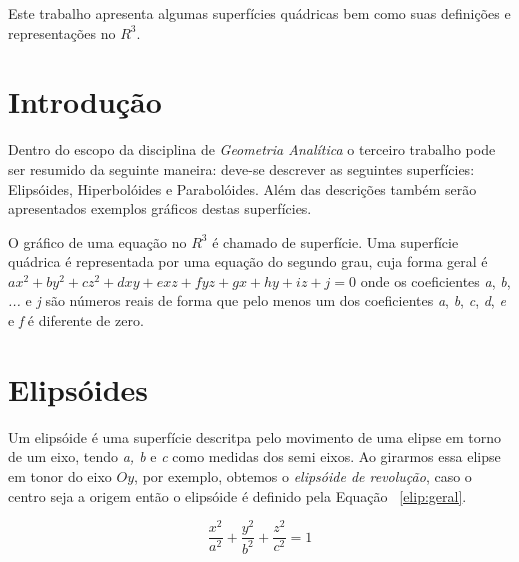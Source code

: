 \documentclass[
	article,			%
	11pt,				%
	oneside,			%
	a4paper,			%
	english,			%
	brazil,				%
	]{abntex2}
\begin{document}
\frenchspacing 

\maketitle

\begin{resumoumacoluna}
    
		Este trabalho apresenta algumas superfícies quádricas bem como suas
		definições e representações no $R^3$.

 \vspace{\onelineskip}
 
 \noindent
\end{resumoumacoluna}

\textual

    \section*{Introdução}

		Dentro do escopo da disciplina de \emph{Geometria Analítica} o terceiro
		trabalho pode ser resumido da seguinte maneira: deve-se descrever as
		seguintes superfícies:  Elipsóides, Hiperbolóides e Parabolóides. Além
		das descrições também serão apresentados exemplos gráficos destas
		superfícies.

		O gráfico de uma equação no $R^3$ é chamado de superfície. Uma
		superfície quádrica é representada por uma equação do segundo grau, cuja
		forma geral é $ ax^2 + by^2 + cz^2 + dxy + exz + fyz + gx + hy + iz + j
		= 0$ onde os coeficientes \emph{a}, \emph{b}, \emph{...} e \emph{j} são
		números reais de forma que pelo menos um dos coeficientes \emph{a},
		\emph{b}, \emph{c}, \emph{d}, \emph{e} e \emph{f} é diferente de zero.

    \section{Elipsóides}

		Um elipsóide é uma superfície descritpa pelo movimento de uma elipse em
		torno de um eixo, tendo \emph{a, b} e \emph{c} como medidas dos semi
		eixos. Ao girarmos essa elipse em tonor do eixo $Oy$, por exemplo,
		obtemos o \emph{elipsóide de revolução}, caso o centro seja a origem
		então o elipsóide é definido pela Equação ~\ref{elip:geral}.

		\begin{equation}\label{elip:geral}
			\frac{x^2}{a^2}+\frac{y^2}{b^2}+\frac{z^2}{c^2}=1
		\end{equation}
\end{document}
